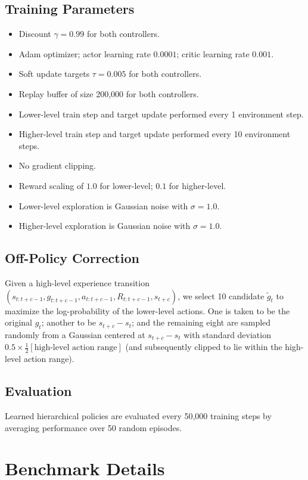 \documentclass{article}
\begin{document}
\subsection{Training Parameters}
\begin{itemize}
\item Discount $\gamma=0.99$ for both controllers.
\item Adam optimizer; actor learning rate $0.0001$; critic learning rate $0.001$.
\item Soft update targets $\tau=0.005$ for both controllers.
\item Replay buffer of size 200,000 for both controllers.
\item Lower-level train step and target update performed every 1 environment step.
\item Higher-level train step and target update performed every 10 environment steps.
\item No gradient clipping.
\item Reward scaling of $1.0$ for lower-level; $0.1$ for higher-level.
\item Lower-level exploration is Gaussian noise with $\sigma=1.0$.
\item Higher-level exploration is Gaussian noise with $\sigma=1.0$.
\end{itemize}

\subsection{Off-Policy Correction}
Given a high-level experience transition $(s_{t:t+c-1}, g_{t:t+c-1}, a_{t:t+c-1}, R_{t:t+c-1}, s_{t+c})$, we select 10 candidate $\tilde{g}_t$ to maximize the log-probability of the lower-level actions.  One is taken to be the original $g_t$; another to be $s_{t+c} - s_t$; and the remaining eight are sampled randomly from a Gaussian centered at $s_{t+c} - s_t$ with standard deviation $0.5\times\frac{1}{2}[\text{high-level action range}]$ (and subsequently clipped to lie within the high-level action range).

\subsection{Evaluation}
Learned hierarchical policies are evaluated every 50,000 training steps by averaging performance over 50 random episodes.

\section{Benchmark Details}
\end{document}
